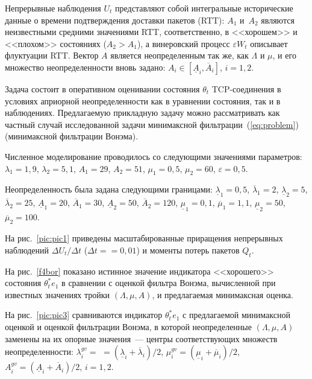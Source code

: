 \begin{multicols}{2}
 Непрерывные наблюдения $U_t$ представляют собой интегральные
 исторические данные о времени подтверждения доставки пакетов (RTT):
 $A_1$ и~$A_2$ являются неизвестными средними значениями RTT, соответственно,
 в <<хорошем>> и <<плохом>> состояниях ($A_2 > A_1$), а винеровский процесс
 $\varepsilon W_t$ описывает флуктуации RTT. Вектор $A$ является
 неопределенным так же, как $\Lambda$ и $\mu$, и его множество
 неопределенности вновь задано: $A_i \in [\underline{A}_i, \overline{A}_i]$,
 $ i=1,2$.

 Задача состоит в оперативном оценивании состояния
 $\theta_t$ TCP-соединения в условиях априорной неопределенности как
 в уравнении состояния, так и в наблюдениях. Предлагаемую прикладную
 задачу можно рассматривать как частный случай исследованной задачи
 минимаксной фильтрации~(\ref{eq:problem}) (минимаксной фильтрации Вонэма).

 Численное моделирование проводилось со следующи\-ми значениями параметров:
 $\lambda_1=1{,}9$, $\lambda_2=5{,}1$, $A_1=29$, $A_2=51$, $\mu_1=0{,}5$,
 $\mu_2=60$,\linebreak 
  $\varepsilon=0{,}5$.

 Неопределенность была задана следующими границами:
 $\underline{\lambda}_1=0{,}5$, $\overline{\lambda}_1=2$,
 $\underline{\lambda}_2=5$, $\overline{\lambda}_2=25$,
 $\underline{A}_1=20$, $\overline{A}_1=30$,
 $\underline{A}_2=50$, $\overline{A}_2=120$,
 $\underline{\mu}_1=0{,}1$, $\overline{\mu}_1=1{,}1$,
 $\underline{\mu}_2=50$, $\overline{\mu}_2=100$.

 На рис.~\ref{pic:pic1} приведены масштабированные приращения непрерывных
 наблюдений ${\Delta U_t}/{\Delta t}$ ($\Delta t=$\linebreak $=0,01$)
 и моменты потерь пакетов $Q_t$.


 На рис.~\ref{f4bor} показано истинное значение индикатора
<<хорошего>> состояния $\theta_t^*e_1$ в сравнении с оценкой
фильтра Вонэма, вычисленной при известных значениях тройки
$(\Lambda,\mu,A)$, и предлагаемая минимаксная оценка.


На рис.~\ref{pic:pic3} сравниваются индикатор $\theta_t^*e_1$ с предлагаемой 
минимаксной оценкой и оценкой фильтрации Вонэма, в которой неопределенные 
$(\Lambda,\mu,A)$ заменены на их опорные значения~--- центры соответствующих 
множеств неопределенности: $\lambda_i^{gv}=$\linebreak 
$={(\underline{\lambda}_i+\overline{\lambda}_i)}/{2}$, 
$\mu_i^{gv}={(\underline{\mu}_i+\overline{\mu}_i)}/{2}$, 
$A_i^{gv}={(\underline{A}_i+\overline{A}_i)}/{2}$, $i=1,2$.



\end{multicols}
